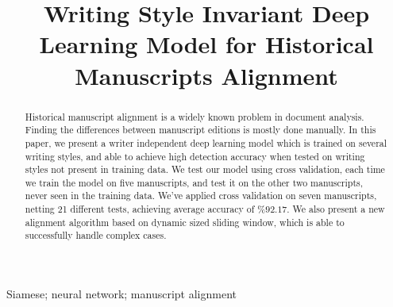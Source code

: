\documentclass[10pt, a4paper, conference, compsocconf]{IEEEtran}
\begin{document}
%
\title{Writing Style Invariant Deep Learning Model for Historical Manuscripts Alignment}




\author{
	\and
	
	\and
	}

\maketitle


\begin{abstract}
	Historical manuscript alignment is a widely known problem in document analysis. Finding the differences between manuscript editions is mostly done manually. In this paper, we present a writer independent deep learning model which is trained on several writing styles, and able to achieve high detection accuracy when tested on writing styles not present in training data. We test our model using cross validation, each time we train the model on five manuscripts, and test it on the other two manuscripts, never seen in the training data. We've applied cross validation on seven manuscripts, netting 21 different tests, achieving average accuracy of $\%92.17$. We also present a new alignment algorithm based on dynamic sized sliding window, which is able to successfully handle complex cases.
\end{abstract}


\begin{IEEEkeywords}
Siamese; neural network; manuscript alignment

\end{IEEEkeywords}
\end{document}
